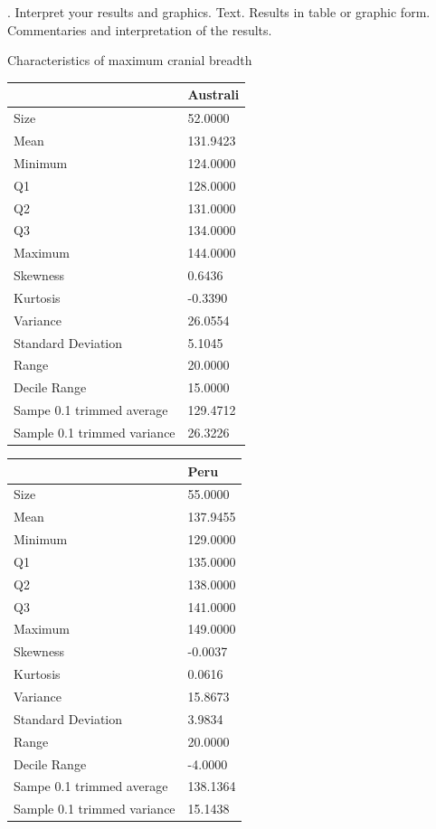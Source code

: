 \documentclass[12pt, oneside]{report}\usepackage[]{graphicx}\usepackage[]{color}
\begin{document}
. Interpret your results and graphics.
\noindent Text. Results in table or graphic form. Commentaries and interpretation of the results.\\

\begin{center}
Characteristics of maximum cranial breadth \\
\end{center}

\begin{tabular}{|l|l|}
  \hline
 & Australi \\ 
  \hline
Size &  52.0000 \\ 
  Mean & 131.9423 \\ 
  Minimum & 124.0000 \\ 
  Q1 & 128.0000 \\ 
  Q2 & 131.0000 \\ 
  Q3 & 134.0000 \\ 
  Maximum & 144.0000 \\ 
  Skewness &   0.6436 \\ 
  Kurtosis &  -0.3390 \\ 
  Variance &  26.0554 \\ 
  Standard Deviation &   5.1045 \\ 
  Range &  20.0000 \\ 
  Decile Range &  15.0000 \\ 
  Sampe 0.1 trimmed average & 129.4712 \\ 
  Sample 0.1 trimmed variance &  26.3226 \\ 
   \hline
\end{tabular}
\begin{tabular}{|l|l|}
  \hline
 & Peru \\ 
  \hline
Size &  55.0000 \\ 
  Mean & 137.9455 \\ 
  Minimum & 129.0000 \\ 
  Q1 & 135.0000 \\ 
  Q2 & 138.0000 \\ 
  Q3 & 141.0000 \\ 
  Maximum & 149.0000 \\ 
  Skewness &  -0.0037 \\ 
  Kurtosis &   0.0616 \\ 
  Variance &  15.8673 \\ 
  Standard Deviation &   3.9834 \\ 
  Range &  20.0000 \\ 
  Decile Range &  -4.0000 \\ 
  Sampe 0.1 trimmed average & 138.1364 \\ 
  Sample 0.1 trimmed variance &  15.1438 \\ 
   \hline
\end{tabular}
\end{document}
